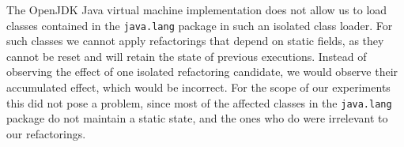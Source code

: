 \documentclass[sigconf,review,anonymous]{acmart}
\begin{document}
The OpenJDK Java virtual machine implementation does not allow us to load
classes contained in the \texttt{java.lang} package in such an isolated class
loader. For such classes we cannot apply refactorings that depend on static
fields, as they cannot be reset and will retain the state of previous
executions. Instead of observing the effect of one isolated refactoring
candidate, we would observe their accumulated effect, which would be incorrect.
For the scope of our
experiments this did not pose a problem, since most of the affected classes in
the \texttt{java.lang} package do not maintain a static state, and the ones who do
were irrelevant to our refactorings.





\end{document}
